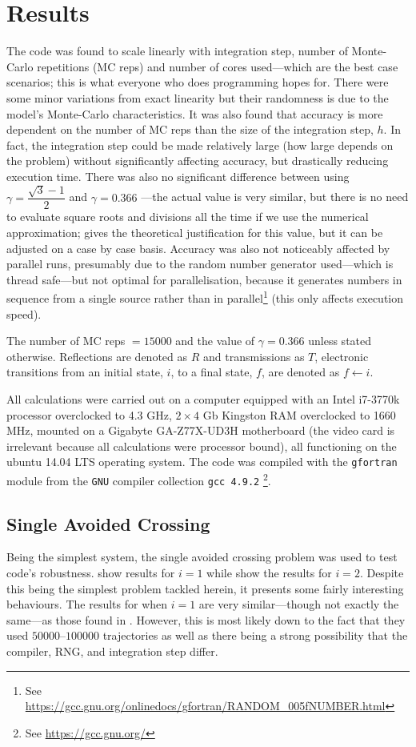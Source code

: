 \chapter{Results}\label{c:r}
%
The code was found to scale linearly with integration step, number of Monte-Carlo repetitions (MC reps) and number of cores used---which are the best case scenarios; this is what everyone who does programming hopes for. There were some minor variations from exact linearity but their randomness is due to the model's Monte-Carlo characteristics. It was also found that accuracy is more dependent on the number of MC reps than the size of the integration step, $ h $. In fact, the integration step could be made relatively large (how large depends on the problem) without significantly affecting accuracy, but drastically reducing execution time. There was also no significant difference between using $ \gamma = \dfrac{\sqrt{3}-1}{2} $ and $ \gamma = 0.366 $ \cite{project}---the actual value is very similar, but there is no need to evaluate square roots and divisions all the time if we use the numerical approximation; \cite{project} gives the theoretical justification for this value, but it can be adjusted on a case by case basis. Accuracy was also not noticeably affected by parallel runs, presumably due to the random number generator used---which is thread safe---but not optimal for parallelisation, because it generates numbers in sequence from a single source rather than in parallel\footnote{See \url{https://gcc.gnu.org/onlinedocs/gfortran/RANDOM_005fNUMBER.html}} (this only affects execution speed).

The number of MC reps $ = 15000 $ and the value of $ \gamma = 0.366 $ unless stated otherwise. Reflections are denoted as $ R $ and transmissions as $ T $, electronic transitions from an initial state, $ i $, to a final state, $ f $, are denoted as $ f \leftarrow i $. 

All calculations were carried out on a computer equipped with an Intel i7-3770k processor overclocked to 4.3 GHz, $ 2\times4 $ Gb Kingston RAM overclocked to 1660 MHz, mounted on a Gigabyte GA-Z77X-UD3H motherboard (the video card is irrelevant because all calculations were processor bound), all functioning on the {\ubuntumono ubuntu 14.04 LTS} operating system. The code was compiled with the \texttt{gfortran} module from the \texttt{GNU} compiler collection \texttt{gcc 4.9.2} \footnote{See \url{https://gcc.gnu.org/}}.
%
\section{Single Avoided Crossing}
%
Being the simplest system, the single avoided crossing problem was used to test code's robustness.  show results for $ i = 1 $ while  show the results for $ i = 2 $. Despite this being the simplest problem tackled herein, it presents some fairly interesting behaviours. The results for when $ i = 1 $ are very similar---though not exactly the same---as those found in \cite{project}. However, this is most likely down to the fact that they used $ 50000\text{--}100000$ trajectories as well as there being a strong possibility that the compiler, RNG, and integration step differ.

